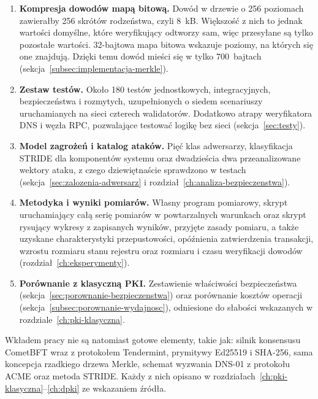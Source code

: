 \begin{enumerate}
    \item \textbf{Kompresja dowodów mapą bitową.} Dowód w drzewie o 256 poziomach zawierałby 256 skrótów rodzeństwa, czyli 8~kB. Większość z nich to jednak wartości domyślne, które weryfikujący odtworzy sam, więc przesyłane są tylko pozostałe wartości. 32-bajtowa mapa bitowa wskazuje poziomy, na których się one znajdują. Dzięki temu dowód mieści się w tylko 700~bajtach (sekcja~\ref{subsec:implementacja-merkle}).

    \item \textbf{Zestaw testów.} Około 180 testów jednostkowych, integracyjnych, bezpieczeństwa i rozmytych, uzupełnionych o siedem scenariuszy uruchamianych na sieci czterech walidatorów. Dodatkowo atrapy weryfikatora DNS i węzła RPC, pozwalające testować logikę bez sieci (sekcja~\ref{sec:testy}).

    \item \textbf{Model zagrożeń i katalog ataków.} Pięć klas adwersarzy, klasyfikacja STRIDE dla komponentów systemu oraz dwadzieścia dwa przeanalizowane wektory ataku, z czego dziewiętnaście sprawdzono w testach (sekcja~\ref{sec:zalozenia-adwersarz} i rozdział~\ref{ch:analiza-bezpieczenstwa}).

    \item \textbf{Metodyka i wyniki pomiarów.} Własny program pomiarowy, skrypt uruchamiający całą serię pomiarów w powtarzalnych warunkach oraz skrypt rysujący wykresy z zapisanych wyników, przyjęte zasady pomiaru, a także uzyskane charakterystyki przepustowości, opóźnienia zatwierdzenia transakcji, wzrostu rozmiaru stanu rejestru oraz rozmiaru i czasu weryfikacji dowodów (rozdział~\ref{ch:eksperymenty}).

    \item \textbf{Porównanie z klasyczną PKI.} Zestawienie właściwości bezpieczeństwa (sekcja~\ref{sec:porownanie-bezpieczenstwa}) oraz porównanie kosztów operacji (sekcja~\ref{subsec:porownanie-wydajnosc}), odniesione do słabości wskazanych w rozdziale~\ref{ch:pki-klasyczna}.
\end{enumerate}

Wkładem pracy nie są natomiast gotowe elementy, takie jak: silnik konsensusu CometBFT wraz z protokołem Tendermint, prymitywy Ed25519 i SHA-256, sama koncepcja rzadkiego drzewa Merkle, schemat wyzwania DNS-01 z protokołu ACME oraz metoda STRIDE. Każdy z nich opisano w rozdziałach~\ref{ch:pki-klasyczna}--\ref{ch:dpki} ze wskazaniem źródła.
